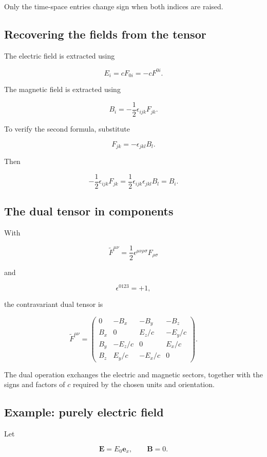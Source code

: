 Only the time-space entries change sign when both indices are raised.

\subsection{Recovering the fields from the tensor}

The electric field is extracted using

\[
\boxed{
E_i
=
cF_{0i}
=
-cF^{0i}
}.
\]

The magnetic field is extracted using

\[
\boxed{
B_i
=
-
\frac{1}{2}
\epsilon_{ijk}F_{jk}
}.
\]

To verify the second formula, substitute

\[
F_{jk}
=
-\epsilon_{jkl}B_l.
\]

Then

\[
-
\frac{1}{2}
\epsilon_{ijk}F_{jk}
=
\frac{1}{2}
\epsilon_{ijk}
\epsilon_{jkl}B_l
=
B_i.
\]

\subsection{The dual tensor in components}

With

\[
\widetilde{F}^{\mu\nu}
=
\frac{1}{2}
\epsilon^{\mu\nu\rho\sigma}
F_{\rho\sigma}
\]

and

\[
\epsilon^{0123}=+1,
\]

the contravariant dual tensor is

\[
\boxed{
\widetilde{F}^{\mu\nu}
=
\begin{pmatrix}
0 & -B_x & -B_y & -B_z\\
B_x & 0 & E_z/c & -E_y/c\\
B_y & -E_z/c & 0 & E_x/c\\
B_z & E_y/c & -E_x/c & 0
\end{pmatrix}
}.
\]

The dual operation exchanges the electric and magnetic sectors, together with the signs and factors of \(c\) required by the chosen units and orientation.

\subsection{Example: purely electric field}

Let

\[
\mathbf{E}
=
E_0\mathbf{e}_x,
\qquad
\mathbf{B}=0.
\]

